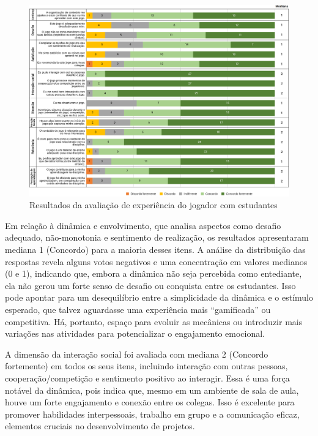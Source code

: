 \documentclass[
	12pt,
	openright,
	twoside,
	a4paper,
	english,
	brazil
	]{abntex2}
\begin{document}
\begin{figure}[H]
	\caption{\label{ufsc-xp-jogador} Resultados da avaliação de experiência do jogador com estudantes}
  \includegraphics[width=\textwidth]{ufsc-xp-jogador}
\end{figure}

Em relação à dinâmica e envolvimento, que analisa aspectos como desafio adequado, não-monotonia e sentimento de realização, os resultados apresentaram mediana 1 (Concordo) para a maioria desses itens. A análise da distribuição das respostas revela alguns votos negativos e uma concentração em valores medianos (0 e 1), indicando que, embora a dinâmica não seja percebida como entediante, ela não gerou um forte senso de desafio ou conquista entre os estudantes. Isso pode apontar para um desequilíbrio entre a simplicidade da dinâmica e o estímulo esperado, que talvez aguardasse uma experiência mais  “gamificada” ou competitiva. Há, portanto, espaço para evoluir as mecânicas ou introduzir mais variações nas atividades para potencializar o engajamento emocional.

A dimensão da interação social foi avaliada com mediana 2 (Concordo fortemente) em todos os seus itens, incluindo interação com outras pessoas, cooperação/competição e sentimento positivo ao interagir. Essa é uma força notável da dinâmica, pois indica que, mesmo em um ambiente de sala de aula, houve um forte engajamento e conexão entre os colegas. Isso é excelente para promover habilidades interpessoais, trabalho em grupo e a comunicação eficaz, elementos cruciais no desenvolvimento de projetos.
\end{document}
